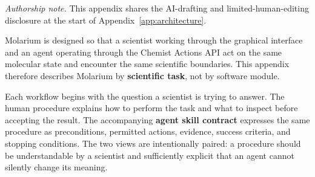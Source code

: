 \documentclass[11pt]{article}
\begin{document}
\newcommand{\workflowsection}[4]{%
  \par\nopagebreak[4]\vspace{7.5pt}%
  {\normalsize\bfseries #1\hspace{1.1em}#2}\par\vspace{2pt}%
  \lead{Status.}#3.\par\vspace{-3.5pt}%
  \lead{The question.}#4\par}

\newenvironment{skillcontract}[1]{%
  \par\nopagebreak[4]\vspace{2pt}%
  {\normalsize\bfseries Agent skill contract: \code{#1}}\par\vspace{1pt}%
  \footnotesize
  \begin{longtable}{@{}K V@{}}
  \toprule
  \textbf{Contract element} & \textbf{Requirement}\\
  \midrule
  \endfirsthead
  \toprule
  \textbf{Contract element} & \textbf{Requirement}\\
  \midrule
  \endhead
  \midrule
  \multicolumn{2}{r}{\footnotesize Continued on next page}\\
  \endfoot
  \bottomrule
  \endlastfoot
}{%
  \end{longtable}
  \small}
\newcommand{\contractrow}[2]{#1 & #2\\}

\newenvironment{smallcomparison}[1]{%
  \par\vspace{2pt}\footnotesize
  \begin{longtable}{@{}#1@{}}\toprule
}{%
  \bottomrule\end{longtable}
  \small}

\textit{Authorship note.} This appendix shares the AI-drafting and limited-human-editing disclosure at the start of Appendix~\ref{app:architecture}.

Molarium is designed so that a scientist working through the graphical interface and an agent operating through the Chemist Actions API act on the same molecular state and encounter the same scientific boundaries. This appendix therefore describes Molarium by \textbf{scientific task}, not by software module.

Each workflow begins with the question a scientist is trying to answer. The human procedure explains how to perform the task and what to inspect before accepting the result. The accompanying \textbf{agent skill contract} expresses the same procedure as preconditions, permitted actions, evidence, success criteria, and stopping conditions. The two views are intentionally paired: a procedure should be understandable by a scientist and sufficiently explicit that an agent cannot silently change its meaning.
\end{document}
